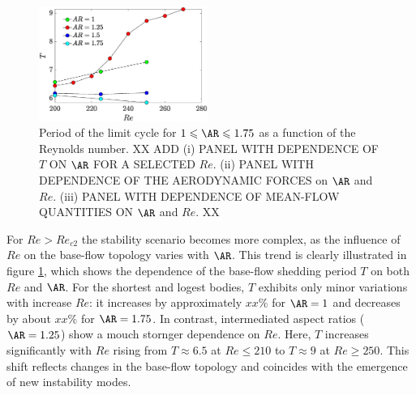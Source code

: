 \begin{figure}
  \centering
  \includegraphics[width=0.49\textwidth]{./fig/AR1s/T_Re.eps}
  \caption{Period of the limit cycle for $1 \le \AR \le 1.75$ as a function of the Reynolds number. XX ADD (i) PANEL WITH DEPENDENCE OF $T$ ON $\AR$ FOR A SELECTED $Re$. (ii) PANEL WITH DEPENDENCE OF THE AERODYNAMIC FORCES on $\AR$ and $Re$. (iii) PANEL WITH DEPENDENCE OF MEAN-FLOW QUANTITIES ON $\AR$ and $Re$. XX}
  \label{fig:T_Re_small}
\end{figure}
%
For $Re>Re_{c2}$ the stability scenario becomes more complex, as the influence of $Re$ on the base-flow topology varies with $\AR$. This trend is clearly illustrated in figure \ref{fig:T_Re_small}, which shows the dependence of the base-flow shedding period $T$ on both $Re$ and $\AR$. For the shortest and logest bodies, $T$ exhibits only minor variations with increase $Re$: it increases by approximately $xx\%$ for $\AR =1$ and decreases by about $xx\%$ for $\AR=1.75$. In contrast, intermediated aspect ratios ($\AR=1.25$) show a mouch stornger dependence on $Re$. Here, $T$ increases significantly with $Re$ rising from $T \approx 6.5$ at $Re \le 210$ to $T \approx 9$ at $Re \ge 250$. This shift reflects changes in the base-flow topology and coincides with the emergence of new instability modes. %

